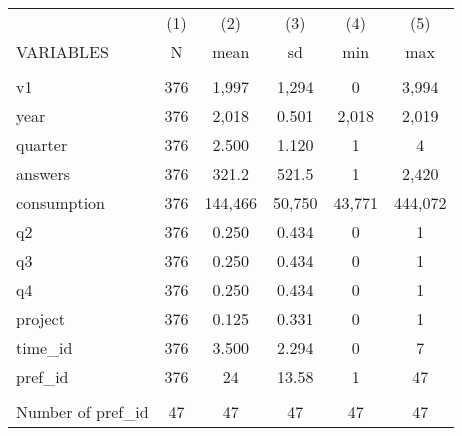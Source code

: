 \documentclass[]{article}
\begin{document}
\begin{tabular}{lccccc} \hline
 & (1) & (2) & (3) & (4) & (5) \\
VARIABLES & N & mean & sd & min & max \\ \hline
 &  &  &  &  &  \\
v1 & 376 & 1,997 & 1,294 & 0 & 3,994 \\
year & 376 & 2,018 & 0.501 & 2,018 & 2,019 \\
quarter & 376 & 2.500 & 1.120 & 1 & 4 \\
answers & 376 & 321.2 & 521.5 & 1 & 2,420 \\
consumption & 376 & 144,466 & 50,750 & 43,771 & 444,072 \\
q2 & 376 & 0.250 & 0.434 & 0 & 1 \\
q3 & 376 & 0.250 & 0.434 & 0 & 1 \\
q4 & 376 & 0.250 & 0.434 & 0 & 1 \\
project & 376 & 0.125 & 0.331 & 0 & 1 \\
time\_id & 376 & 3.500 & 2.294 & 0 & 7 \\
pref\_id & 376 & 24 & 13.58 & 1 & 47 \\
 &  &  &  &  &  \\
 Number of pref\_id & 47 & 47 & 47 & 47 & 47 \\ \hline
\end{tabular}
\end{document}
